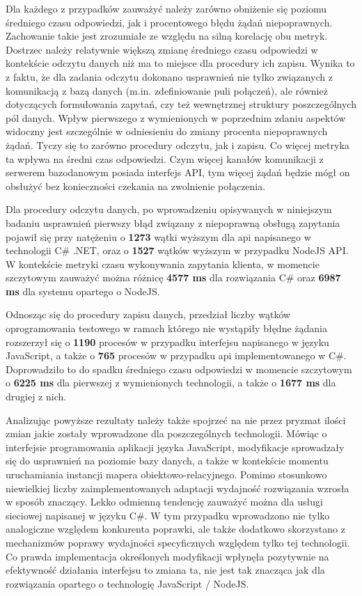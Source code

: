 Dla każdego z przypadków zauważyć należy zarówno obniżenie się poziomu średniego czasu odpowiedzi, jak i procentowego błędu żądań niepoprawnych. Zachowanie takie jest zrozumiałe ze względu na silną korelację obu metryk. Dostrzec należy relatywnie większą zmianę średniego czasu odpowiedzi w kontekście odczytu danych niż ma to miejsce dla procedury ich zapisu. Wynika to z faktu, że dla zadania odczytu dokonano usprawnień nie tylko związanych z komunikacją z bazą danych (m.in. zdefiniowanie puli połączeń), ale również dotyczących formułowania zapytań, czy też wewnętrznej struktury poszczególnych pól danych. Wpływ pierwszego z wymienionych w poprzednim zdaniu aspektów widoczny jest szczególnie w odniesieniu do zmiany procenta niepoprawnych żądań. Tyczy się to zarówno procedury odczytu, jak i zapisu. Co więcej metryka ta wpływa na średni czas odpowiedzi. Czym więcej kanałów komunikacji z serwerem bazodanowym posiada interfejs API, tym więcej żądań będzie mógł on obsłużyć bez konieczności czekania na zwolnienie połączenia.

Dla procedury odczytu danych, po wprowadzeniu opisywanych w niniejszym badaniu usprawnień pierwszy błąd związany z niepoprawną obsługą zapytania pojawił się przy natężeniu o \textbf{1273} wątki wyższym dla api napisanego w technologii C\# .NET, oraz o \textbf{1527} wątków wyższym w przypadku NodeJS API. W kontekście metryki czasu wykonywania zapytania klienta, w momencie szczytowym zauważyć można różnicę \textbf{4577 ms} dla rozwiązania C\# oraz \textbf{6987 ms} dla systemu opartego o NodeJS.

Odnosząc się do procedury zapisu danych, przedział liczby wątków oprogramowania testowego w ramach którego nie wystąpiły błędne żądania rozszerzył się o \textbf{1190} procesów w przypadku interfejsu napisanego w języku JavaScript, a także o \textbf{765} procesów w przypadku api implementowanego w C\#. Doprowadziło to do spadku średniego czasu odpowiedzi w momencie szczytowym o \textbf{6225 ms} dla pierwszej z wymienionych technologii, a także o \textbf{1677 ms} dla drugiej z nich.

Analizując powyższe rezultaty należy także spojrzeć na nie przez pryzmat ilości zmian jakie zostały wprowadzone dla poszczególnych technologii. Mówiąc o interfejsie programowania aplikacji języka JavaScript, modyfikacje sprowadzały się do usprawnień na poziomie bazy danych, a także w kontekście momentu uruchamiania instancji mapera obiektowo-relacyjnego. Pomimo stosunkowo niewielkiej liczby zaimplementowanych adaptacji wydajność rozwiązania wzrosła w sposób znaczący. Lekko odmienną tendencję zauważyć można dla usługi sieciowej napisanej w języku C\#. W tym przypadku wprowadzono nie tylko analogiczne względem konkurenta poprawki, ale także dodatkowo skorzystano z mechanizmów poprawy wydajności specyficznych względem tylko tej technologii. Co prawda implementacja określonych modyfikacji wpłynęła pozytywnie na efektywność działania interfejsu to zmiana ta, nie jest tak znacząca jak dla rozwiązania opartego o technologię JavaScript / NodeJS. 
